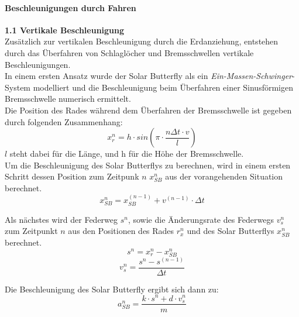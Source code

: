   \paragraph{Beschleunigungen durch Fahren}
  \begin{description}
    \item \textbf{1.1 Vertikale Beschleunigung}\\
    Zusätzlich zur vertikalen Beschleunigung durch die Erdanziehung, entstehen durch das Überfahren von Schlaglöcher und Bremsschwellen vertikale Beschleunigungen.\\
    In einem ersten Ansatz wurde der Solar Butterfly als ein \emph{Ein-Massen-Schwinger}-System modelliert und die Beschleunigung beim Überfahren einer Sinusförmigen Bremsschwelle numerisch ermittelt.\\

    Die Position des Rades während dem Überfahren der Bremsschwelle ist gegeben durch folgenden Zusammenhang:
    \begin{equation}
      x_r^n = h \cdot sin\left(\pi \cdot \frac{n\Delta t \cdot v}{l}\right)
    \end{equation}
    $l$ steht dabei für die Länge, und h für die Höhe der Bremsschwelle.\\

    Um die Beschleunigung des Solar Butterflys zu berechnen, wird in einem ersten Schritt dessen Position zum Zeitpunk $n$ $x_{SB}^n$ aus der vorangehenden Situation berechnet.
    \begin{equation}
      x_{SB}^n = x_{SB}^{(n-1)} + v^{(n-1)} \cdot \Delta t
    \end{equation}

    Als nächstes wird der Federweg $s^n$, sowie die Änderungsrate des Federwegs $v_s^n$ zum Zeitpunkt $n$ aus den Positionen des Rades $r_x^n$ und des Solar Butterflys $x_{SB}^n$ berechnet.
    \begin{equation}
      s^n = x_r^n - x_{SB}^n
    \end{equation}
    \begin{equation}
      v_s^n = \frac{s^n - s^{(n-1)}}{\Delta t}
    \end{equation}

    Die Beschleunigung des Solar Butterfly ergibt sich dann zu:\\
    \begin{equation}
      a_{SB}^n = \frac{k \cdot s^n + d \cdot v_s^n}{m}
    \end{equation}


\end{description}
